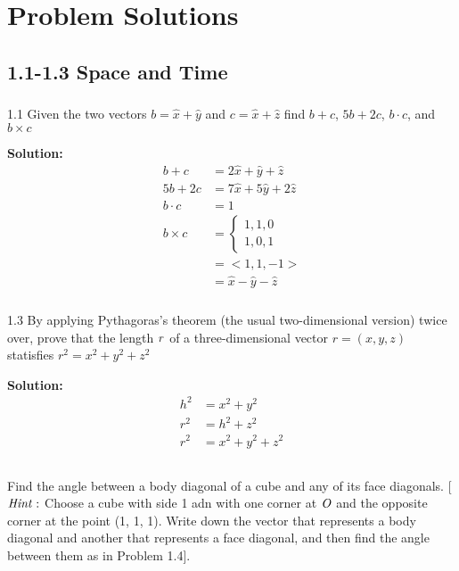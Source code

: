 \documentclass{article}
\newcommand\Problem{%
    \subsubsection{}%
}
\newcommand\TheSolution{%
  \textbf{Solution:}\\%
}
\begin{document}
\section{Problem Solutions}
\subsection{1.1-1.3 Space and Time}
\Problem 1.1 Given the two vectors $b = \hat{x} + \hat{y}$ and $c = \hat{x} + \hat{z}$ find $b + c$, $5b + 2c$, $b \cdot c$, and $b \times c$

\TheSolution {
    \begin{equation}
        \begin{aligned}
            b + c      & = 2\hat{x} + \hat{y} + \hat{z}   \\
            5b + 2c    & = 7\hat{x} + 5\hat{y} + 2\hat{z} \\
            b \cdot c  & = 1                              \\
            b \times c & = \begin{cases}
                               1, 1, 0 \\
                               1, 0, 1
                           \end{cases}                   \\
                       & = <1, 1, -1>                     \\
                       & = \hat{x} - \hat{y} - \hat{z}
        \end{aligned}
    \end{equation}
}

\Problem 1.3 By applying Pythagoras's theorem (the usual two-dimensional version) twice over, prove that the length $\it{r}$ of a three-dimensional vector $r = (x, y, z)$ statisfies $r^2 = x^2 + y^2 + z^2$

\TheSolution
\begin{equation}
    \begin{aligned}
        h^2 & = x^2 + y^2       \\
        r^2 & = h^2 + z^2       \\
        r^2 & = x^2 + y^2 + z^2 \\
    \end{aligned}
\end{equation}

\Problem Find the angle between a body diagonal of a cube and any of its face diagonals. [$\it{Hint:}$ Choose a cube with side 1 adn with one corner at $\it{O}$ and the opposite corner at the point (1, 1, 1). Write down the vector that represents a body diagonal and another that represents a face diagonal, and then find the angle between them as in Problem 1.4].
\end{document}
